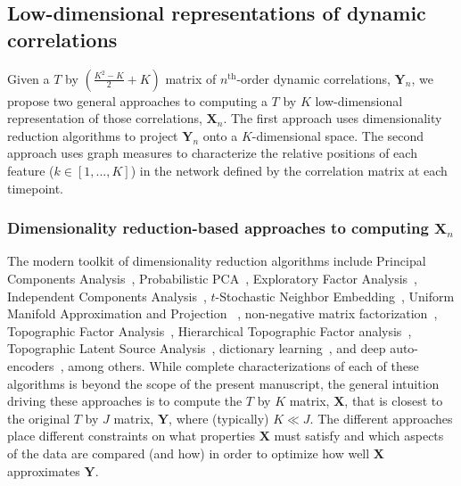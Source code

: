 \documentclass[english]{article}
\providecommand{\DIFaddbegin}{} %
\providecommand{\DIFaddend}{} %
\providecommand{\DIFdelbegin}{} %
\providecommand{\DIFdelend}{} %
\newcommand{\DIFscaledelfig}{0.5}
\newlength{\DIFdelgraphicswidth} %
\newlength{\DIFdelgraphicsheight} %
\newcommand{\DIFaddincludegraphics}[2][]{{\color{blue}\fbox{\DIFOincludegraphics[#1]{#2}}}} %
\newcommand{\DIFdelincludegraphics}[2][]{%
\sbox{\DIFdelgraphicsbox}{\DIFOincludegraphics[#1]{#2}}%
\settoboxwidth{\DIFdelgraphicswidth}{\DIFdelgraphicsbox} %
\settoboxtotalheight{\DIFdelgraphicsheight}{\DIFdelgraphicsbox} %
\scalebox{\DIFscaledelfig}{%
\parbox[b]{\DIFdelgraphicswidth}{\usebox{\DIFdelgraphicsbox}\\[-\baselineskip] \rule{\DIFdelgraphicswidth}{0em}}\llap{\resizebox{\DIFdelgraphicswidth}{\DIFdelgraphicsheight}{%
\setlength{\unitlength}{\DIFdelgraphicswidth}%
\begin{picture}(1,1)%
\thicklines\linethickness{2pt} %
{\color[rgb]{1,0,0}\put(0,0){\framebox(1,1){}}}%
{\color[rgb]{1,0,0}\put(0,0){\line( 1,1){1}}}%
{\color[rgb]{1,0,0}\put(0,1){\line(1,-1){1}}}%
\end{picture}%
}\hspace*{3pt}}} %
} %
\DeclareRobustCommand{\DIFaddbegin}{\DIFOaddbegin \let\includegraphics\DIFaddincludegraphics} %
\DeclareRobustCommand{\DIFaddend}{\DIFOaddend \let\includegraphics\DIFOincludegraphics} %
\DeclareRobustCommand{\DIFdelbegin}{\DIFOdelbegin \let\includegraphics\DIFdelincludegraphics} %
\DeclareRobustCommand{\DIFdelend}{\DIFOaddend \let\includegraphics\DIFOincludegraphics} %
\begin{document}
\subsection*{Low-dimensional representations of dynamic
  correlations}

Given a $T$ by $\left( \frac{K^2 - K}{2} + K \right)$ matrix of
$n^\mathrm{th}$-order dynamic correlations, $\mathbf{Y}_n$, we propose
two general approaches to computing a $T$ by $K$ low-dimensional
representation of those correlations, $\mathbf{X}_n$.  The first
approach uses dimensionality reduction algorithms to project
$\mathbf{Y}_n$ onto a $K$-dimensional space.  The second approach uses
graph measures to characterize the relative positions of each feature
($k \in \left[1, ..., K \right]$) in the network defined by the
correlation matrix at each timepoint.

\subsubsection*{Dimensionality reduction-based approaches to computing
  $\mathbf{X}_n$}

The modern toolkit of dimensionality reduction algorithms include
Principal Components Analysis~\citep[PCA;][]{Pear01}, Probabilistic
PCA~\citep[PPCA;][]{TippBish99}, Exploratory Factor
Analysis~\citep[EFA;][]{Spea04}, Independent Components
Analysis~\citep[ICA;][]{JuttHera91, ComoEtal91}, $t$-Stochastic
Neighbor Embedding~\citep[$t$-SNE;][]{MaatHint08}, Uniform Manifold
Approximation and Projection~\DIFdelbegin %
\DIFdelend \DIFaddbegin \citep[UMAP;][]{McInEtal18}\DIFaddend , non-negative
matrix factorization~\citep[NMF;][]{LeeSeun99}, Topographic Factor
Analysis~\cite[TFA;][]{MannEtal14b}, Hierarchical Topographic Factor
analysis~\cite[HTFA;][]{MannEtal18}, Topographic Latent Source
Analysis~\cite[TLSA;][]{GersEtal11}, dictionary
learning~\citep{MairEtal09a, MairEtal09b}, and deep
auto-encoders~\citep{HintSala06}, among others.  While complete
characterizations of each of these algorithms is beyond the scope of
the present manuscript, the general intuition driving these approaches
is to compute the $T$ by $K$ matrix, $\mathbf{X}$, that is closest to
the original $T$ by $J$ matrix, $\mathbf{Y}$, where (typically)
$K \ll J$.  The different approaches place different constraints on
what properties $\mathbf{X}$ must satisfy and which aspects of the
data are compared (and how) in order to optimize how well
$\mathbf{X}$ approximates $\mathbf{Y}$.
\end{document}
